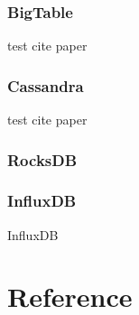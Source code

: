 \documentclass[12pt,a4paper,oneside]{book}
\begin{document}
\subsection{BigTable}

test cite paper\cite{db:bigtable}

\subsection{Cassandra}

test cite paper\cite{db:cassandra}

\subsection{RocksDB}

\subsection{InfluxDB}

InfluxDB

\clearpage

\chapter*{Reference}
\printbibliography
\end{document}
